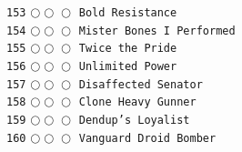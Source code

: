 \documentclass[a4paper,landscape]{article}
\begin{document}
\begin{multicols*}{5}
\texttt{153} \(\bigcirc\!\bigcirc\!\bigcirc\)  \texttt{Bold Resistance} \vspace{-0.3mm}\\ 
\texttt{154} \(\bigcirc\!\bigcirc\!\bigcirc\)  \texttt{Mister Bones I Performed } \vspace{-0.3mm}\\ 
\texttt{155} \(\bigcirc\!\bigcirc\!\bigcirc\)  \texttt{Twice the Pride} \vspace{-0.3mm}\\ 
\texttt{156} \(\bigcirc\!\bigcirc\!\bigcirc\)  \texttt{Unlimited Power} \vspace{-0.3mm}\\ 
\texttt{157} \(\bigcirc\!\bigcirc\!\bigcirc\)  \texttt{Disaffected Senator} \vspace{-0.3mm}\\ 
\texttt{158} \(\bigcirc\!\bigcirc\!\bigcirc\)  \texttt{Clone Heavy Gunner} \vspace{-0.3mm}\\ 
\texttt{159} \(\bigcirc\!\bigcirc\!\bigcirc\)  \texttt{Dendup's Loyalist} \vspace{-0.3mm}\\ 
\texttt{160} \(\bigcirc\!\bigcirc\!\bigcirc\)  \texttt{Vanguard Droid Bomber} \vspace{-0.3mm}\\ 

\end{multicols*}
\end{document}
